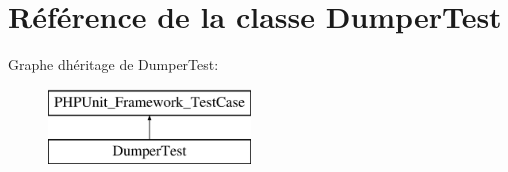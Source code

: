 \hypertarget{class_symfony_1_1_component_1_1_yaml_1_1_tests_1_1_dumper_test}{}\section{Référence de la classe Dumper\+Test}
\label{class_symfony_1_1_component_1_1_yaml_1_1_tests_1_1_dumper_test}
Graphe d\textquotesingle{}héritage de Dumper\+Test\+:\begin{figure}[H]
\begin{center}
\leavevmode
\includegraphics[height=2.000000cm]{class_symfony_1_1_component_1_1_yaml_1_1_tests_1_1_dumper_test}
\end{center}
\end{figure}
